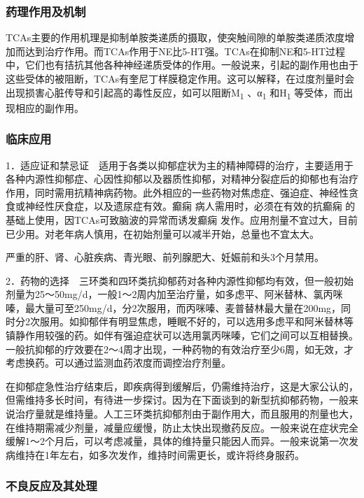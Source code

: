 \subsubsection{药理作用及机制}

TCAs主要的作用机理是抑制单胺类递质的摄取，使突触间隙的单胺类递质浓度增加而达到治疗作用。而TCAs作用于NE比5-HT强。TCAs在抑制NE和5-HT过程中，它们也有拮抗其他各种神经递质受体的作用。一般说来，引起的副作用也由于这些受体的被阻断，TCAs有奎尼丁样膜稳定作用。这可以解释，在过度剂量时会出现损害心脏传导和引起高的毒性反应，如可以阻断M\textsubscript{1}
、α\textsubscript{1} 和H\textsubscript{1} 等受体，而出现相应的副作用。

\subsubsection{临床应用}

1．适应证和禁忌证　适用于各类以抑郁症状为主的精神障碍的治疗，主要适用于各种内源性抑郁症、心因性抑郁以及器质性抑郁，对精神分裂症后的抑郁也有治疗作用，同时需用抗精神病药物。此外相应的一些药物对焦虑症、强迫症、神经性贪食或神经性厌食症，以及遗尿症有效。癫痫
病人需用时，必须在有效的抗癫痫
的基础上使用，因TCAs可致脑波的异常而诱发癫痫
发作。应用剂量不宜过大，目前已少用。对老年病人慎用，在初始剂量可以减半开始，总量也不宜太大。

严重的肝、肾、心脏疾病、青光眼、前列腺肥大、妊娠前和头3个月禁用。

2．药物的选择　三环类和四环类抗抑郁药对各种内源性抑郁均有效，但一般初始剂量为25～50mg/d，一般1～2周内加至治疗量，如多虑平、阿米替林、氯丙咪嗪，最大量可至250mg/d，分2次服用，而丙咪嗪、麦普替林最大量在200mg，同时分2次服用。如抑郁伴有明显焦虑，睡眠不好的，可以选用多虑平和阿米替林等镇静作用较强的药。如伴有强迫症状可以选用氯丙咪嗪，它们之间可以互相替换。一般抗抑郁的疗效要在2～4周才出现，一种药物的有效治疗至少6周，如无效，才考虑换药。可以通过监测血药浓度而调控治疗剂量。

在抑郁症急性治疗结束后，即疾病得到缓解后，仍需维持治疗，这是大家公认的，但需维持多长时间，有待进一步探讨。因为在下面谈到的新型抗抑郁药物，一般来说治疗量就是维持量。人工三环类抗抑郁剂由于副作用大，而且服用的剂量也大，在维持期需减少剂量，减量应缓慢，防止太快出现撤药反应。一般来说在症状完全缓解1～2个月后，可以考虑减量，具体的维持量只能因人而异。一般来说第一次发病维持在1年左右，如多次发作，维持时间需更长，或许将终身服药。

\subsubsection{不良反应及其处理}

